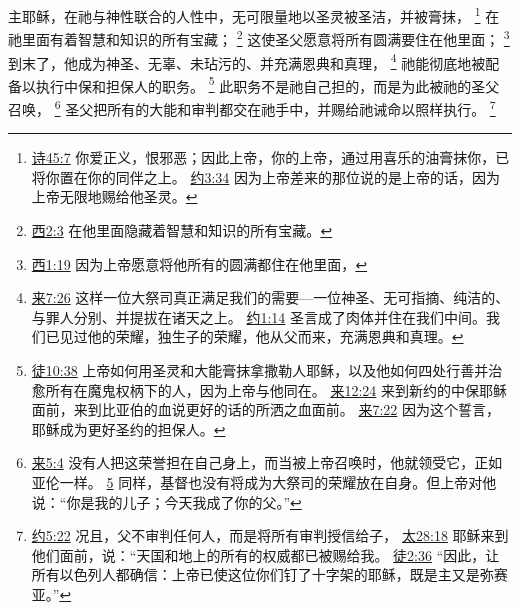 \documentclass[12pt, a4paper, oneside]{ctexart}
\newcounter{parnum}[section]
\newcommand{\N}{%
   \noindent\refstepcounter{parnum}%
    \makebox[\parindent][l]{\textbf{\arabic{parnum}.}}}
\begin{document}
\N 主耶稣，在祂与神性联合的人性中，无可限量地以圣灵被圣洁，并被膏抹，
	\footnote {
		\href{https://biblehub.com/psalms/45-7.htm}{诗45:7} 你爱正义，恨邪恶；因此上帝，你的上帝，通过用喜乐的油膏抹你，已将你置在你的同伴之上。
		\href{https://biblehub.com/john/3-34.htm}{约3:34} 因为上帝差来的那位说的是上帝的话，因为上帝无限地赐给他圣灵。
	}
	在祂里面有着智慧和知识的所有宝藏；
	\footnote {
		\href{https://biblehub.com/colossians/2-3.htm}{西2:3} 在他里面隐藏着智慧和知识的所有宝藏。
	}
	这使圣父愿意将所有圆满要住在他里面；
	\footnote {
		\href{https://biblehub.com/colossians/1-19.htm}{西1:19} 因为上帝愿意将他所有的圆满都住在他里面，
	}
	到末了，他成为神圣、无辜、未玷污的、并充满恩典和真理，
	\footnote {
		\href{https://biblehub.com/hebrews/7-26.htm}{来7:26} 这样一位大祭司真正满足我们的需要---一位神圣、无可指摘、纯洁的、与罪人分别、并提拔在诸天之上。
		\href{https://biblehub.com/john/1-14.htm}{约1:14} 圣言成了肉体并住在我们中间。我们已见过他的荣耀，独生子的荣耀，他从父而来，充满恩典和真理。
	}
	祂能彻底地被配备以执行中保和担保人的职务。
	\footnote {
		\href{https://biblehub.com/acts/10-38.htm}{徒10:38} 上帝如何用圣灵和大能膏抹拿撒勒人耶稣，以及他如何四处行善并治愈所有在魔鬼权柄下的人，因为上帝与他同在。
		\href{https://biblehub.com/hebrews/12-24.htm}{来12:24} 来到新约的中保耶稣面前，来到比亚伯的血说更好的话的所洒之血面前。
		\href{https://biblehub.com/hebrews/7-22.htm}{来7:22} 因为这个誓言，耶稣成为更好圣约的担保人。
	}
	此职务不是祂自己担的，而是为此被祂的圣父召唤，
	\footnote {
		\href{https://biblehub.com/hebrews/5-4.htm}{来5:4} 没有人把这荣誉担在自己身上，而当被上帝召唤时，他就领受它，正如亚伦一样。
		\href{https://biblehub.com/hebrews/5-5.htm}{5} 同样，基督也没有将成为大祭司的荣耀放在自身。但上帝对他说：“你是我的儿子；今天我成了你的父。”
	}
	圣父把所有的大能和审判都交在祂手中，并赐给祂诫命以照样执行。
	\footnote {
		\href{https://biblehub.com/john/5-22.htm}{约5:22} 况且，父不审判任何人，而是将所有审判授信给子，
		\href{https://biblehub.com/matthew/28-18.htm}{太28:18} 耶稣来到他们面前，说：“天国和地上的所有的权威都已被赐给我。
		\href{https://biblehub.com/acts/2-36.htm}{徒2:36} “因此，让所有以色列人都确信：上帝已使这位你们钉了十字架的耶稣，既是主又是弥赛亚。”
	}
\end{document}
